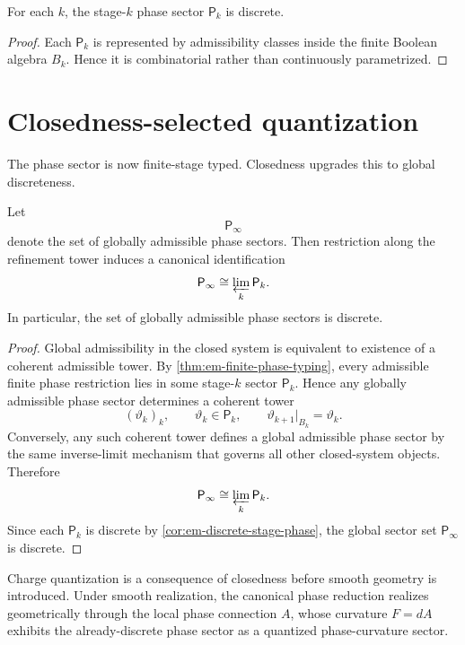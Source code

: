 \begin{corollary}
	\label{cor:em-discrete-stage-phase}
	For each \(k\), the stage-\(k\) phase sector \(\mathsf P_k\) is
	discrete.
\end{corollary}
\begin{proof}
	Each \(\mathsf P_k\) is represented by admissibility classes inside the
	finite Boolean algebra \(B_k\).
	Hence it is combinatorial rather than continuously parametrized.
\end{proof}
\section{Closedness-selected quantization}
\label{sec:em-closedness-quantization}
The phase sector is now finite-stage typed.
Closedness upgrades this to global discreteness.
\begin{theorem}
	\label{thm:em-closedness-phase}
	Let
	\[
		\mathsf P_\infty
	\]
	denote the set of globally admissible phase sectors.
	Then restriction along the refinement tower induces a canonical
	identification
	\[
		\mathsf P_\infty \cong \varprojlim_k \mathsf P_k.
	\]
	In particular, the set of globally admissible phase sectors is
	discrete.
\end{theorem}
\begin{proof}
	Global admissibility in the closed system is equivalent to existence of
	a coherent admissible tower.
	By \cref{thm:em-finite-phase-typing}, every admissible finite phase
	restriction lies in some stage-\(k\) sector \(\mathsf P_k\).
	Hence any globally admissible phase sector determines a coherent tower
	\[
		(\vartheta_k)_k,
		\qquad
		\vartheta_k\in\mathsf P_k,
		\qquad
		\vartheta_{k+1}|_{B_k}=\vartheta_k.
	\]
	Conversely, any such coherent tower defines a global admissible phase
	sector by the same inverse-limit mechanism that governs all other
	closed-system objects.
	Therefore
	\[
		\mathsf P_\infty \cong \varprojlim_k \mathsf P_k.
	\]
	Since each \(\mathsf P_k\) is discrete by
	\cref{cor:em-discrete-stage-phase}, the global sector set
	\(\mathsf P_\infty\) is discrete.
\end{proof}
\begin{corollary}
	Charge quantization is a consequence of closedness before smooth
	geometry is introduced.
	Under smooth realization, the canonical phase reduction realizes
	geometrically through the local phase connection \(A\), whose
	curvature \(F=dA\) exhibits the already-discrete phase sector as a
	quantized phase-curvature sector.
\end{corollary}

